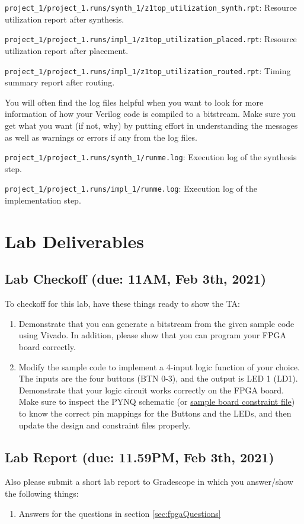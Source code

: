 \documentclass[11pt]{article}
\begin{document}
\verb|project_1/project_1.runs/synth_1/z1top_utilization_synth.rpt|: Resource utilization report after synthesis.

\verb|project_1/project_1.runs/impl_1/z1top_utilization_placed.rpt|: Resource utilization report after placement.

\verb|project_1/project_1.runs/impl_1/z1top_utilization_routed.rpt|: Timing summary report after routing.

You will often find the log files helpful when you want to look for more information of how your Verilog code is compiled to a bitstream. Make sure you get what you want (if not, why) by putting effort in understanding the messages as well as warnings or errors if any from the log files.

\verb|project_1/project_1.runs/synth_1/runme.log|: Execution log of the synthesis step.

\verb|project_1/project_1.runs/impl_1/runme.log|:  Execution log of the implementation step.

\section{Lab Deliverables}
\subsection{Lab Checkoff (due: 11AM, Feb 3th, 2021)}
To checkoff for this lab, have these things ready to show the TA:
\begin{enumerate}
  \item Demonstrate that you can generate a bitstream from the given sample code using Vivado. In addition, please show that you can program your FPGA board correctly.
  \item Modify the sample code to implement a 4-input logic function of your choice. The inputs are the four buttons (BTN 0-3), and the output is LED 1 (LD1). Demonstrate that your logic circuit works correctly on the FPGA board. Make sure to inspect the PYNQ schematic (or \href{https://reference.digilentinc.com/_media/reference/programmable-logic/pynq-z1/pynq-z1_c.zip}{sample board constraint file}) to know the correct pin mappings for the Buttons and the LEDs, and then update the design and constraint files properly.
\end{enumerate}

\subsection{Lab Report (due: 11.59PM, Feb 3th, 2021)}\label{sec:labreport}
Also please submit a short lab report to Gradescope in which you answer/show the following things:
\begin{enumerate}
  \item Answers for the questions in section \ref{sec:fpgaQuestions}
\end{enumerate}
\end{document}
